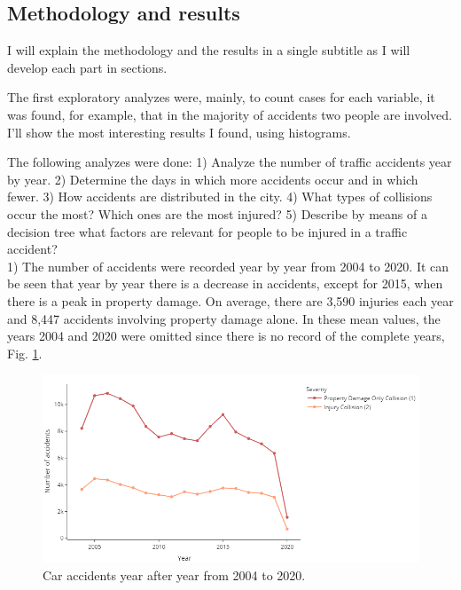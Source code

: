 \documentclass[12pt]{article}
\begin{document}
\subsection*{Methodology and results}
I will explain the methodology and the results in a single subtitle as I will develop each part in sections.

  The first exploratory analyzes were, mainly, to count cases for each variable, it was found, for example, that in the majority of accidents two people are involved. I'll show the most interesting results I found, using histograms.


  The following analyzes were done: 1) Analyze the number of traffic accidents year by year. 2) Determine the days in which more accidents occur and in which fewer. 3) How accidents are distributed in the city. 4) What types of collisions occur the most? Which ones are the most injured? 5) Describe by means of a decision tree what factors are relevant for people to be injured in a traffic accident? \\

  1) The number of accidents were recorded year by year from 2004 to 2020. It can be seen that year by year there is a decrease in accidents, except for 2015, when there is a peak in property damage. On average, there are 3,590 injuries each year and 8,447 accidents involving property damage alone. In these mean values, the years 2004 and 2020 were omitted since there is no record of the complete years, Fig. \ref{fig:years}. \\

      

  \begin{figure}[htbp]
    \centering
      \includegraphics[width=1\textwidth]{../images/years.png}
    \caption{Car accidents year after year from 2004 to 2020.}
    \label{fig:years}
  \end{figure}
\end{document}
